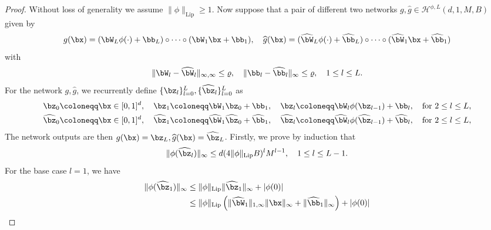 \documentclass[11pt]{article}
\begin{document}
\begin{proof}
    Without loss of generality we assume $\|\phi\|_{\mathrm{Lip}} \ge 1$.
    Now suppose that a pair of different two networks $g, \widehat{g} \in \mathcal{H}^{\phi,L}(d, 1, M,B)$ given by 
    \begin{equation*}
        g(\bx) = (\bW_{L} \phi(\cdot) + \bb_{L}) \circ \cdots \circ (\bW_1 \bx + \bb_{1}), \quad \widehat{g}(\bx) = (\widehat{\bW}_{L} \phi(\cdot) + \widehat{\bb}_{L}) \circ \cdots \circ (\widehat{\bW}_1 \bx + \widehat{\bb}_{1})
    \end{equation*}
    with
    \begin{equation*}
        \|\bW_{l} - \widehat{\bW}_l\|_{\infty, \infty} \leq \varrho, \quad \|\bb_l - \widehat{\bb}_l\|_{\infty} \leq \varrho, \quad 1 \leq l \leq L.
    \end{equation*}
    For the network $g, \widehat{g}$, we recurrently define $\{\bz_l\}_{l=0}^L, \{\widehat{\bz}_l\}_{l=0}^L$ as 
    \begin{equation*}
        \begin{aligned}
            & {\bz}_0 \coloneqq  \bx \in [0,1]^d, \quad \bz_1 \coloneqq  \bW_1 \bz_0 + \bb_1, \quad  \bz_l \coloneqq  \bW_l \phi(\bz_{l-1}) + \bb_l, \quad \text{for } 2 \le l \le L, \\
            & \widehat{\bz}_0 \coloneqq  \bx \in [0,1]^d, \quad \widehat{\bz}_1 \coloneqq  \widehat{\bW}_1 \widehat{\bz}_0 + \widehat{\bb}_1, \quad  \widehat{\bz}_l \coloneqq  \widehat{\bW}_l \phi(\widehat{\bz}_{l-1}) + \widehat{\bb}_l, \quad \text{for } 2 \le l \le L,
        \end{aligned}
    \end{equation*}
    The network outputs are then $g(\bx) = \bz_L, \widehat{g}(\bx) = \widehat{\bz}_L$. Firstly, we prove by induction that 
    \begin{equation*}
        \| \phi (\widehat{\bz}_l)\|_{\infty} \leq d(4 \|\phi\|_{\mathrm{Lip}}B)^{l} M^{l-1}, \quad 1 \leq l \leq L-1.
    \end{equation*}
    For the base case $l=1$, we have 
    \begin{equation*}
        \begin{aligned}
            \|\phi(\widehat{\bz}_1)\|_{\infty}  & \leq \|\phi\|_{\mathrm{Lip}} \|\widehat{\bz}_1\|_{\infty} + |\phi(0)| \\
            & \leq \|\phi\|_{\mathrm{Lip}} \left( \| \widehat{\bW}_1\|_{1, \infty} \|\bx\|_{\infty} + \|\widehat{\bb}_1\|_{\infty}\right) + |\phi(0)|  \\

\end{aligned}
\end{equation*}
\end{proof}
\end{document}
